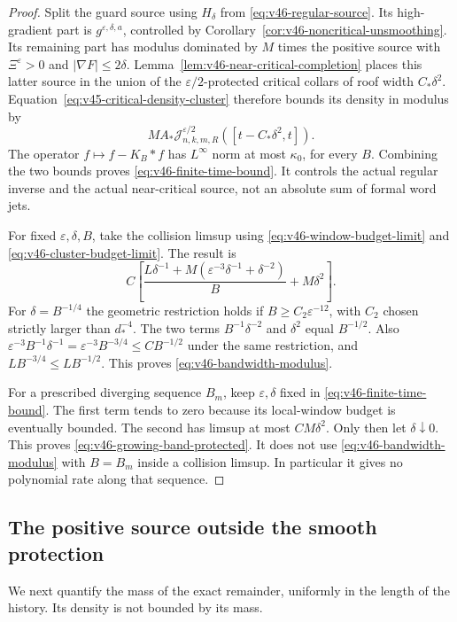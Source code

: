 \begin{proof}
Split the guard source using $H_\delta$ from
\eqref{eq:v46-regular-source}. Its high-gradient part is
$g^{\varepsilon,\delta,a}$, controlled by
Corollary~\ref{cor:v46-noncritical-unsmoothing}. Its remaining part
has modulus dominated by $M$ times the positive source with
$\Xi^{\varepsilon}>0$ and $|\nabla F|\le2\delta$.
Lemma~\ref{lem:v46-near-critical-completion} places this latter source
in the union of the $\varepsilon/2$-protected critical collars of roof
width $C_*\delta^2$. Equation~\eqref{eq:v45-critical-density-cluster}
therefore bounds its density in modulus by
\[
 MA_*\mathcal J^{\varepsilon/2}_{n,k,m,R}
                                      ([t-C_*\delta^2,t]).
\]
The operator $f\mapsto f-K_B*f$ has $L^\infty$ norm at most
$\kappa_0$, for every $B$. Combining the two bounds proves
\eqref{eq:v46-finite-time-bound}. It controls the actual regular
inverse and the actual near-critical source, not an absolute sum of
formal word jets.

For fixed $\varepsilon,\delta,B$, take the collision limsup using
\eqref{eq:v46-window-budget-limit} and
\eqref{eq:v46-cluster-budget-limit}. The result is
\begin{equation}\label{eq:v46-two-parameter-modulus}
 C\left[\frac{L\delta^{-1}
           +M(\varepsilon^{-3}\delta^{-1}+\delta^{-2})}{B}
                         +M\delta^2\right].
\end{equation}
For $\delta=B^{-1/4}$ the geometric restriction holds if
$B\ge C_2\varepsilon^{-12}$, with $C_2$ chosen strictly larger than
$d_*^{-4}$. The two terms $B^{-1}\delta^{-2}$ and $\delta^2$ equal
$B^{-1/2}$. Also
$\varepsilon^{-3}B^{-1}\delta^{-1}
   =\varepsilon^{-3}B^{-3/4}\le C B^{-1/2}$
under the same restriction, and $LB^{-3/4}\le LB^{-1/2}$.
This proves \eqref{eq:v46-bandwidth-modulus}.

For a prescribed diverging sequence $B_m$, keep
$\varepsilon,\delta$ fixed in \eqref{eq:v46-finite-time-bound}.
The first term tends to zero because its local-window budget is
eventually bounded. The second has limsup at most $CM\delta^2$.
Only then let $\delta\downarrow0$. This proves
\eqref{eq:v46-growing-band-protected}. It does not use
\eqref{eq:v46-bandwidth-modulus} with $B=B_m$ inside a collision
limsup. In particular it gives no polynomial rate along that sequence.
\end{proof}

\subsection{The positive source outside the smooth protection}
We next quantify the mass of the exact remainder, uniformly in the
length of the history. Its density is not bounded by its mass.

